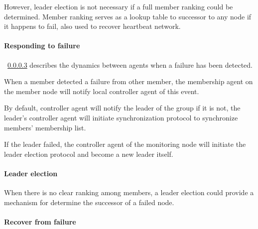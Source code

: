 However, leader election is not necessary if a full member ranking could be
determined. Member ranking serves as a lookup table to successor to any node if it
happens to fail, also used to recover heartbeat network.


\paragraph{Responding to failure}

~\ref{} describes the dynamics between agents when a failure has been detected.

When a member detected a failure from other member, the membership agent on the
member node will notify local controller agent of this event. 

By default, controller agent will notify the leader of the group if it is not,
the leader’s controller agent will initiate synchronization protocol to
synchronize members’ membership list.

If the leader failed, the controller agent of the monitoring node will initiate
the leader election protocol and become a new leader itself.


\paragraph{Leader election}

When there is no clear ranking among members, a leader election could provide a mechanism for determine the successor of a failed node.






\paragraph{Recover from failure}

